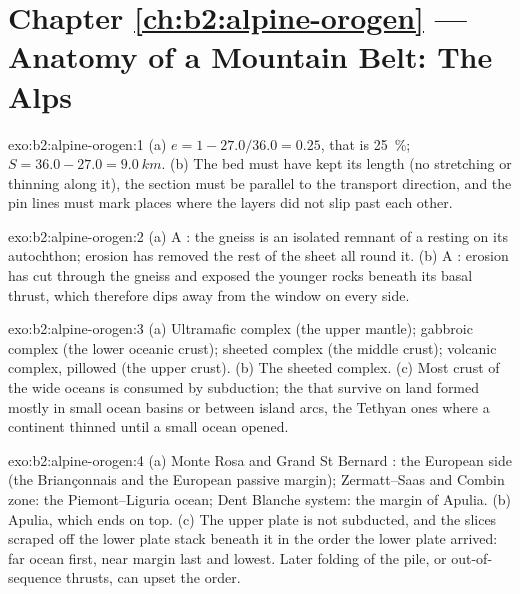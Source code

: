 \section*{Chapter \ref{ch:b2:alpine-orogen} --- Anatomy of a Mountain Belt: The Alps}

\begin{solution}{exo:b2:alpine-orogen:1}
(a) $e = 1 - 27.0/36.0 = 0.25$, that is \qty{25}{\percent}; $S = 36.0 - 27.0 =
\qty{9.0}{km}$. (b) The bed must have kept its length (no stretching or thinning along it),
the section must be parallel to the transport direction, and the pin lines must mark places
where the layers did not slip past each other.
\end{solution}

\begin{solution}{exo:b2:alpine-orogen:2}
(a) A : the gneiss is an isolated remnant of a  resting on its autochthon;
erosion has removed the rest of the sheet all round it. (b) A : erosion has
cut through the gneiss  and exposed the younger rocks beneath its basal thrust, which
therefore dips away from the window on every side.
\end{solution}

\begin{solution}{exo:b2:alpine-orogen:3}
(a) Ultramafic complex (the upper mantle); gabbroic complex (the lower oceanic crust);
sheeted  complex (the middle crust); volcanic complex, pillowed (the upper crust).
(b) The sheeted  complex. (c) Most crust of the wide oceans is consumed by subduction;
the  that survive on land formed mostly in small ocean basins or between island
arcs, the Tethyan ones where a continent thinned until a small ocean opened.
\end{solution}

\begin{solution}{exo:b2:alpine-orogen:4}
(a) Monte Rosa and Grand St Bernard : the European side (the Briançonnais and the
European passive margin); Zermatt--Saas and Combin zone: the Piemont--Liguria ocean; Dent
Blanche system: the margin of Apulia. (b) Apulia, which ends on top. (c) The upper plate is
not subducted, and the slices scraped off the lower plate stack beneath it in the order the
lower plate arrived: far ocean first, near margin last and lowest. Later folding of the pile,
or out-of-sequence thrusts, can upset the order.
\end{solution}

